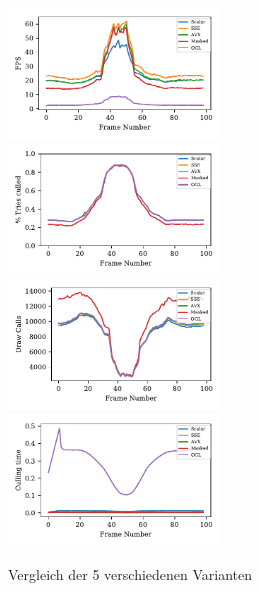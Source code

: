 \documentclass[journal]{vgtc}
\begin{document}
\begin{figure}
	\begin{minipage}{0.5\textwidth}
		\includegraphics[width=0.5\textwidth]{images/Evaluation_1_Results_FPS.pdf}
		\includegraphics[width=0.5\textwidth]{images/Evaluation_1_Results_Percentage culled.pdf}
		\includegraphics[width=0.5\textwidth]{images/Evaluation_1_Results_Draw Calls.pdf}
		\includegraphics[width=0.5\textwidth]{images/Evaluation_1_Results_Culling time.pdf}
		\caption{Vergleich der 5 verschiedenen Varianten}
		\label{fig:performance_all_5}
	\end{minipage}
\end{figure}
\end{document}
